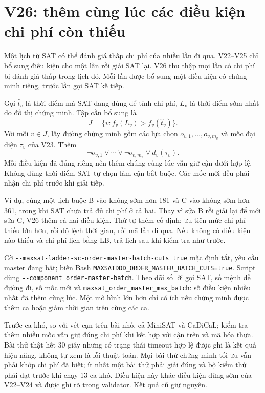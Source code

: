 \documentclass[11pt,a4paper]{article}
\newcommand{\file}[1]{\nolinkurl{#1}}
\begin{document}
\section{V26: thêm cùng lúc các điều kiện chi phí còn thiếu}

Một lịch từ SAT có thể đánh giá thấp chi phí của nhiều lần đi qua.
V22--V25 chỉ bổ sung điều kiện cho một lần rồi giải SAT lại. V26 thu thập
mọi lần có chi phí bị đánh giá thấp trong lịch đó. Mỗi lần được bổ sung
một điều kiện có chứng minh riêng, trước lần gọi SAT kế tiếp.

Gọi $\widehat t_v$ là thời điểm mà SAT đang dùng để tính chi phí, $L_v$
là thời điểm sớm nhất do đồ thị chứng minh. Tập cần bổ sung là
\[
 J=\{v:f_v(L_v)>f_v(\widehat t_v)\}.
\]
Với mỗi $v\in J$, lấy đường chứng minh gồm các lựa chọn
$o_{v,1},\ldots,o_{v,m_v}$ và mốc đại diện $\tau_v$ của V23. Thêm
\[
 \neg o_{v,1}\lor\cdots\lor\neg o_{v,m_v}\lor d_v(\tau_v).
\]
Mỗi điều kiện đã đúng riêng nên thêm chúng cùng lúc vẫn giữ cận dưới
hợp lệ. Không dùng thời điểm SAT tự chọn làm cận bắt buộc. Các mốc mới
đều phải nhận chi phí trước khi giải tiếp.

Ví dụ, cùng một lịch buộc B vào không sớm hơn 181 và C vào không sớm
hơn 361, trong khi SAT chưa trả đủ chi phí ở cả hai. Thay vì sửa B rồi
giải lại để mới sửa C, V26 thêm cả hai điều kiện. Thứ tự thêm cố định:
ưu tiên mức chi phí thiếu lớn hơn, rồi độ lệch thời gian, rồi mã lần đi
qua. Nếu không có điều kiện nào thiếu và chi phí lịch bằng LB, trả lịch
sau khi kiểm tra như trước.

Cờ \file{--maxsat-ladder-sc-order-master-batch-cuts true} mặc định tắt,
yêu cầu master đang bật; biến Bash
\file{MAXSATDDD_ORDER_MASTER_BATCH_CUTS=true}. Script dùng
\file{--component order-master-batch}. Theo dõi số lời gọi SAT, số
mệnh đề đường đi, số mốc mới và
\file{maxsat_order_master_max_batch}: số điều kiện nhiều nhất đã thêm
cùng lúc. Một mô hình lớn hơn chỉ có ích nếu chứng minh được thêm ca
hoặc giảm thời gian trên cùng các ca.

Trước ca khó, so với vét cạn trên bài nhỏ, cả MiniSAT và CaDiCaL; kiểm
tra thêm nhiều mốc vẫn giữ đúng chi phí khi kết hợp với cận trên và mã
hóa thưa. Bài thử thật hết 30 giây nhưng có trạng thái timeout hợp lệ
được ghi là kết quả hiệu năng, không tự xem là lỗi thuật toán. Mọi bài
thử chứng minh tối ưu vẫn phải khớp chi phí đã biết; ít nhất một bài thử
phải giải đúng và bộ kiểm thử phải đạt trước khi chạy 13 ca khó. Điều
kiện này khác điều kiện dừng sớm của V22--V24 và được ghi rõ trong
validator. Kết quả cũ giữ nguyên.
\end{document}
